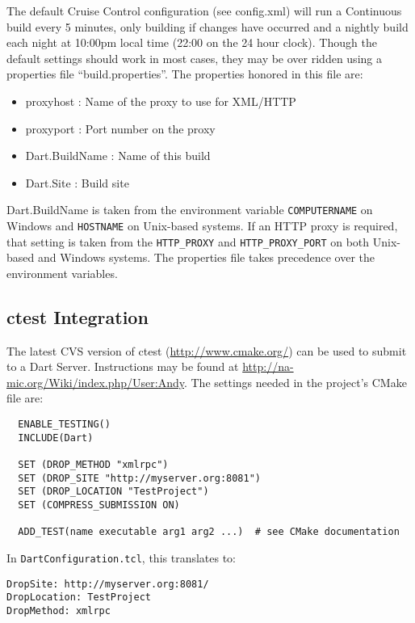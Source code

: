 \documentclass{InsightBook}
\newcommand{\filename}[1]{\texttt{#1}}
\begin{document}
The default Cruise Control configuration (see config.xml) will run a
Continuous build every 5 minutes, only building if changes have
occurred and a nightly build each night at 10:00pm local time (22:00 on
the 24 hour clock).  Though the default settings should work in most
cases, they may be over ridden using a properties file
``build.properties''.  The properties honored in this file are:

\begin{itemize}
  \item proxyhost : Name of the proxy to use for XML/HTTP
  \item proxyport : Port number on the proxy
  \item Dart.BuildName : Name of this build
  \item Dart.Site : Build site
\end{itemize}

Dart.BuildName is taken from the environment variable
\texttt{COMPUTERNAME} on Windows and \texttt{HOSTNAME} on Unix-based systems.  If an
HTTP proxy is required, that setting is taken from the
 \texttt{HTTP\_PROXY} and \texttt{HTTP\_PROXY\_PORT} on both Unix-based
and Windows systems.  The properties file takes precedence over the
environment variables.

\subsection{ctest Integration}
The latest CVS version of ctest (\url{http://www.cmake.org/}) can be used to submit to a Dart
Server.  Instructions may be found at
\url{http://na-mic.org/Wiki/index.php/User:Andy}.
The settings needed in the project's CMake file are:
\begin{verbatim}
  ENABLE_TESTING()
  INCLUDE(Dart)

  SET (DROP_METHOD "xmlrpc")
  SET (DROP_SITE "http://myserver.org:8081")
  SET (DROP_LOCATION "TestProject")
  SET (COMPRESS_SUBMISSION ON)

  ADD_TEST(name executable arg1 arg2 ...)  # see CMake documentation
\end{verbatim}

In \filename{DartConfiguration.tcl}, this translates to:
\begin{verbatim}
DropSite: http://myserver.org:8081/
DropLocation: TestProject
DropMethod: xmlrpc
\end{verbatim}



\end{document}
